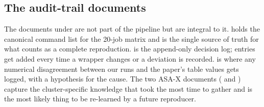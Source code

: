 \subsection{The audit-trail documents}
\label{sec:repro-audit}

The documents under  are not part of the pipeline but are integral to it.  holds the canonical command list for the 20-job matrix and is the single source of truth for what counts as a complete reproduction.  is the append-only decision log; entries get added every time a wrapper changes or a deviation is recorded.  is where any numerical disagreement between our runs and the paper's table values gets logged, with a hypothesis for the cause. The two ASA-X documents ( and ) capture the cluster-specific knowledge that took the most time to gather and is the most likely thing to be re-learned by a future reproducer.
